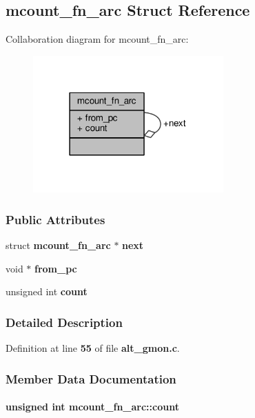 \subsection{mcount\+\_\+fn\+\_\+arc Struct Reference}
\label{structmcount__fn__arc}


Collaboration diagram for mcount\+\_\+fn\+\_\+arc\+:\nopagebreak
\begin{figure}[H]
\begin{center}
\leavevmode
\includegraphics[width=207pt]{de/dd9/structmcount__fn__arc__coll__graph}
\end{center}
\end{figure}
\subsubsection*{Public Attributes}
\begin{DoxyCompactItemize}
\item 
struct {\bf mcount\+\_\+fn\+\_\+arc} $\ast$ {\bf next}
\item 
void $\ast$ {\bf from\+\_\+pc}
\item 
unsigned int {\bf count}
\end{DoxyCompactItemize}


\subsubsection{Detailed Description}


Definition at line {\bf 55} of file {\bf alt\+\_\+gmon.\+c}.



\subsubsection{Member Data Documentation}
\paragraph[{count}]{\setlength{\rightskip}{0pt plus 5cm}unsigned int mcount\+\_\+fn\+\_\+arc\+::count}\label{structmcount__fn__arc_ae0bf08e8107e642fd6660a2f4e2f592c}


